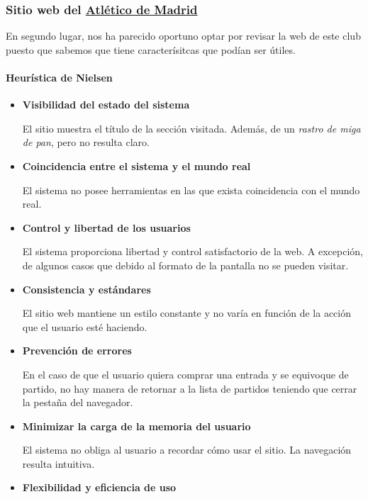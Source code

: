 \documentclass[10pt, spanish, pdftex]{template/UC3M_document}
\begin{document}
\subsubsection{Sitio web del \href{https://www.atleticodemadrid.com/}{Atlético de Madrid}}
En segundo lugar, nos ha parecido oportuno optar por revisar la web de este club puesto que sabemos que tiene caracterísitcas que podían ser útiles.

\paragraph{Heurística de Nielsen}
\begin{itemize}
  \item \textbf{Visibilidad del estado del sistema}

  El sitio muestra el título de la sección visitada. Además, de un \textit{rastro de miga de pan}, pero no resulta claro.

  \item \textbf{Coincidencia entre el sistema y el mundo real}

  El sistema no posee herramientas en las que exista coincidencia con el mundo real.

  \item \textbf{Control y libertad de los usuarios}

  El sistema proporciona libertad y control satisfactorio de la web. A excepción, de algunos casos que debido al formato de la pantalla no se pueden visitar.

  \item \textbf{Consistencia y estándares}

  El sitio web mantiene un estilo constante y no varía en función de la acción que el usuario esté haciendo.

  \item \textbf{Prevención de errores}

  En el caso de que el usuario quiera comprar una entrada y se equivoque de partido, no hay manera de retornar a la lista de partidos teniendo que cerrar la pestaña del navegador.

  \item \textbf{Minimizar la carga de la memoria del usuario}

  El sistema no obliga al usuario a recordar cómo usar el sitio. La navegación resulta intuitiva.

  \item \textbf{Flexibilidad y eficiencia de uso}


\end{itemize}
\end{document}

